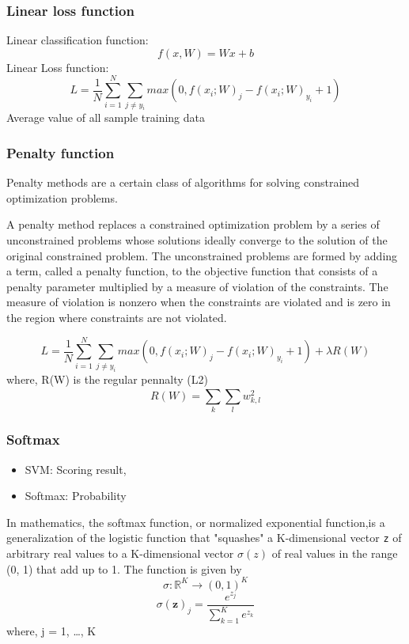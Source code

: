 \documentclass[11pt]{article}
\providecommand{\tightlist}{%
      \setlength{\itemsep}{0pt}\setlength{\parskip}{0pt}}
\begin{document}
    \subsubsection{Linear loss function}\label{linear-loss-function}

Linear classification function: \[f(x,W) = Wx+b\] Linear Loss function:
\[L = \frac{1}{N}\sum_{i=1}^{N}\sum_{j\neq y_{i}}^{ } max(0,f(x_{i};W)_{j} -f(x_{i};W)_{y_{i}} + 1 )\]
Average value of all sample training data

    \subsubsection{Penalty function}\label{penalty-function}

Penalty methods are a certain class of algorithms for solving
constrained optimization problems.

A penalty method replaces a constrained optimization problem by a series
of unconstrained problems whose solutions ideally converge to the
solution of the original constrained problem. The unconstrained problems
are formed by adding a term, called a penalty function, to the objective
function that consists of a penalty parameter multiplied by a measure of
violation of the constraints. The measure of violation is nonzero when
the constraints are violated and is zero in the region where constraints
are not violated.

\[L = \frac{1}{N}\sum_{i=1}^{N}\sum_{j\neq y_{i}}^{ } max(0,f(x_{i};W)_{j} -f(x_{i};W)_{y_{i}} + 1 ) + \lambda R(W)\]
where, R(W) is the regular pennalty (L2)
\[R(W) = \sum_{k}^{ }\sum_{l}^{ }w_{k,l}^{2}\]

    \subsubsection{Softmax}\label{softmax}

\begin{itemize}
\tightlist
\item
  SVM: Scoring result,
\item
  Softmax: Probability
\end{itemize}

In mathematics, the softmax function, or normalized exponential
function,is a generalization of the logistic function that "squashes" a
K-dimensional vector \texttt{z} of arbitrary real values to a
K-dimensional vector \(\sigma (z)\) of real values in the range (0, 1)
that add up to 1. The function is given by
\[\sigma :\mathbb {R} ^{K}\to (0,1)^{K}\]
\[\sigma (\mathbf {z} )_{j}={\frac {e^{z_{j}}}{\sum _{k=1}^{K}e^{z_{k}}}}\]
where, j = 1, \ldots{}, K
\end{document}
